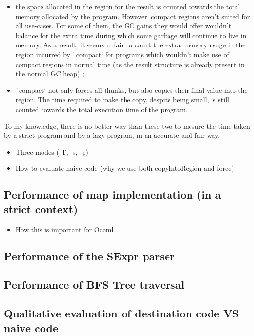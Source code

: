 \documentclass[english]{jflart}
\begin{document}
\begin{itemize}
  \item the space allocated in the region for the result is counted towards the total memory allocated by the program. However, compact regions aren't suited for all use-cases. For some of them, the GC gains they would offer wouldn't balance for the extra time during which some garbage will continue to live in memory. As a result, it seems unfair to count the extra memory usage in the region incurred by \texttt`compact` for programs which wouldn't make use of compact regions in normal time (as the result structure is already present in the normal GC heap) ;
  \item \texttt`compact` not only forces all thunks, but also copies their final value into the region. The time required to make the copy, despite being small, is still counted towards the total execution time of the program.
\end{itemize}

To my knowledge, there is no better way than these two to mesure the time taken by a strict program and by a lazy program, in an accurate and fair way.


\begin{itemize}
\item Three modes (-T, -s, -p)
\item How to evaluate naive code (why we use both copyIntoRegion and force)
\end{itemize}

\subsection{Performance of map implementation (in a strict context)}

\begin{itemize}
\item How this is important for Ocaml
\end{itemize}

\subsection{Performance of the SExpr parser}

\subsection{Performance of BFS Tree traversal}

\subsection{Qualitative evaluation of destination code VS naive code}
\end{document}
